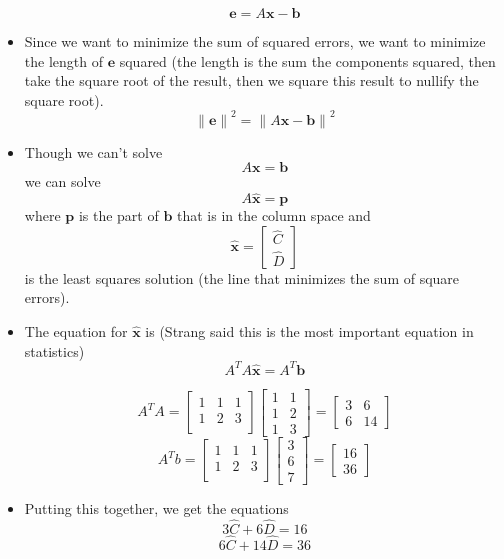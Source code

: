 \documentclass[11pt]{article}
\begin{document}
\begin{itemize}
    \[ \boldsymbol{e} = A\boldsymbol{x} - \boldsymbol{b} \]
    \item Since we want to minimize the sum of squared errors, we want to minimize the length 
    of $\boldsymbol{e}$ squared (the length is the sum the components squared, then take the 
    square root of the result, then we square this result to nullify the square root).
    \[ {\| \boldsymbol{e} \|}^2 = {\| A\boldsymbol{x} - \boldsymbol{b} \|}^2 \]
    \item Though we can't solve 
    \[A\boldsymbol{x} = \boldsymbol{b} \]
    we can solve
    \[A\boldsymbol{\hat{x}} = \boldsymbol{p} \]
    where $\boldsymbol{p}$ is the part of $\boldsymbol{b}$ that is in the column space and
    \[\boldsymbol{\hat{x}} = \begin{bmatrix}
        \hat{C} \\
        \hat{D} 
    \end{bmatrix}\] 
    is the least squares solution (the line that minimizes the sum of square errors).
    \item The equation for $\boldsymbol{\hat{x}}$ is (Strang said this is the most important 
    equation in statistics)
    \[A^T A\boldsymbol{\hat{x}}=A^T \boldsymbol{b}\]

    \[
    A^T A =     
    \begin{bmatrix}
        1 & 1 & 1 \\
        1 & 2 & 3 \\
    \end{bmatrix}  
    \begin{bmatrix}
        1 & 1 \\
        1 & 2 \\
        1 & 3
    \end{bmatrix}  = 
    \begin{bmatrix}
        3 & 6 \\
        6 & 14
    \end{bmatrix}  
    \]
    \[
    A^T b =
    \begin{bmatrix}
        1 & 1 & 1 \\
        1 & 2 & 3 \\
    \end{bmatrix}  
    \begin{bmatrix}
        3 \\
        6 \\
        7
    \end{bmatrix}  = 
    \begin{bmatrix}
        16 \\
        36
    \end{bmatrix} 
    \]
    \item Putting this together, we get the equations
    \[ 3\hat{C} + 6\hat{D} = 16 \]
    \[ 6\hat{C} + 14\hat{D} = 3  6 \]


\end{itemize}
\end{document}
